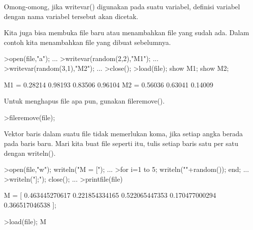 \documentclass[a4paper,10pt]{article}
\begin{document}
\begin{eulernotebook}
\begin{eulercomment}
\begin{eulercomment}
\begin{eulercomment}
\begin{eulercomment}
\begin{eulercomment}
\begin{eulercomment}
\begin{eulercomment}
\begin{eulercomment}
\begin{eulercomment}
Omong-omong, jika writevar() digunakan pada suatu variabel, definisi
variabel dengan nama variabel tersebut akan dicetak.
\end{eulercomment}
\begin{eulercomment}
Kita juga bisa membuka file baru atau menambahkan file yang sudah ada.
Dalam contoh kita menambahkan file yang dibuat sebelumnya.
\end{eulercomment}
\begin{eulerprompt}
>open(file,"a"); ...
>writevar(random(2,2),"M1"); ...
>writevar(random(3,1),"M2"); ...
>close();
>load(file); show M1; show M2;
\end{eulerprompt}
\begin{euleroutput}
  M1 = 
    0.28214   0.98193 
    0.83506   0.96104 
  M2 = 
    0.56036 
    0.63041 
    0.14009 
\end{euleroutput}
\begin{eulercomment}
Untuk menghapus file apa pun, gunakan fileremove().
\end{eulercomment}
\begin{eulerprompt}
>fileremove(file);
\end{eulerprompt}
\begin{eulercomment}
Vektor baris dalam suatu file tidak memerlukan koma, jika setiap angka
berada pada baris baru. Mari kita buat file seperti itu, tulis setiap
baris satu per satu dengan writeln().
\end{eulercomment}
\begin{eulerprompt}
>open(file,"w"); writeln("M = ["); ...
>for i=1 to 5; writeln(""+random()); end; ...
>writeln("];"); close(); ...
>printfile(file)
\end{eulerprompt}
\begin{euleroutput}
  M = [
  0.463445270617
  0.221854334165
  0.522065447353
  0.170477000294
  0.366517046538
  ];
\end{euleroutput}
\begin{eulerprompt}
>load(file); M
\end{eulerprompt}
\begin{euleroutput}

\end{euleroutput}
\end{eulercomment}
\end{eulercomment}
\end{eulercomment}
\end{eulercomment}
\end{eulercomment}
\end{eulercomment}
\end{eulercomment}
\end{eulercomment}
\end{eulernotebook}
\end{document}
